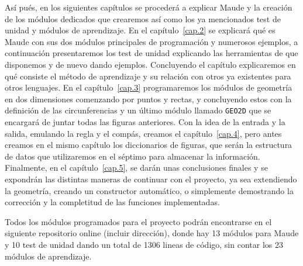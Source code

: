 Así pués, en los siguientes capítulos se procederá a explicar Maude y la creación de los módulos dedicados que crearemos así como los ya mencionados test de unidad y módulos de aprendizaje. En el capítulo~\ref{cap.2} se explicará qué es Maude con sus dos módulos principales de programación y numerosos ejemplos, a continuación presentaremos los test de unidad explicando las herramientas de que disponemos y de nuevo dando ejemplos. Concluyendo el capítulo explicaremos en qué consiste el método de aprendizaje y su relación con otros ya existentes para otros lenguajes. En el capítulo~\ref{cap.3} programaremos los módulos de geometría en dos dimensiones comenzando por puntos y rectas, y concluyendo estos con la definición de las circunferencias y un último módulo llamado \texttt{GEO2D} que se encargará de juntar todas las figuras anteriores. Con la idea de la entrada y la salida, emulando la regla y el compás, creamos el capítulo~\ref{cap.4}, pero antes creamos en el mismo capítulo los diccionarios de figuras, que serán la estructura de datos que utilizaremos en el séptimo para almacenar la información. Finalmente, en el capítulo~\ref{cap.5}, se darán unas conclusiones finales y se expondrán las distintas maneras de continuar con el proyecto, ya sea extendiendo la geometría, creando un constructor automático, o simplemente demostrando la corrección y la completitud de las funciones implementadas.\par

Todos los módulos programados para el proyecto podrán encontrarse en el siguiente repositorio online (incluir dirección), donde hay 13 módulos para Maude y 10 test de unidad dando un total de 1306 lineas de código, sin contar los 23 módulos de aprendizaje. %
